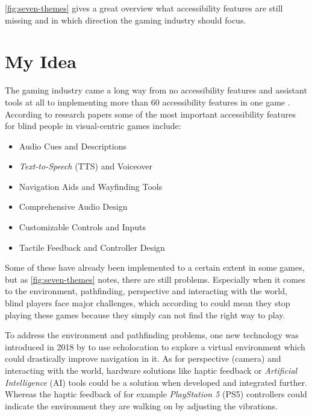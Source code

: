 \documentclass[sigconf,natbib=false,10pt]{acmart}
\begin{document}
	\autoref{fig:seven-themes} gives a great overview what accessibility features are still missing and in which direction the gaming industry should focus.
	
	\section{My Idea} \label{sec:myIdea}
	The gaming industry came a long way from no accessibility features and assistant tools at all to implementing more than 60 accessibility features in one game \cite{playstation_last_2020}.
	According to research papers \cite{goncalves_my_2023, grammenos_designing_2009, grammenos_game_2008, araujo_mobile_2017} some of the most important accessibility features for blind people in visual-centric games include:
	
	\begin{itemize}
		\setlength\itemsep{0.5em}
		\item Audio Cues and Descriptions
		\item \emph{Text-to-Speech} (TTS) and Voiceover
		\item Navigation Aids and Wayfinding Tools
		\item Comprehensive Audio Design
		\item Customizable Controls and Inputs
		\item Tactile Feedback and Controller Design
	\end{itemize}
    
    Some of these have already been implemented to a certain extent in some games, but as \autoref{fig:seven-themes} notes, there are still problems.
    Especially when it comes to the environment, pathfinding, perspective and interacting with the world, blind players face major challenges, which according to \textcite{goncalves_my_2023} could mean they stop playing these games because they simply can not find the right way to play.
    
    To address the environment and pathfinding problems, one new technology was introduced in 2018 by \textcite{andrade_echo-house_2018} to use echolocation to explore a virtual environment which could drastically improve navigation in it.
    As for perspective (camera) and interacting with the world, hardware solutions like haptic feedback or \emph{Artificial Intelligence} (AI) tools could be a solution when developed and integrated further.
    Whereas the haptic feedback \cite{bello_haptics_2016} of for example \emph{PlayStation 5} (PS5) controllers \cite{akyaman_anticipated_2021, chen_gamepad_2024} could indicate the environment they are walking on by adjusting the vibrations.
    
\end{document}
